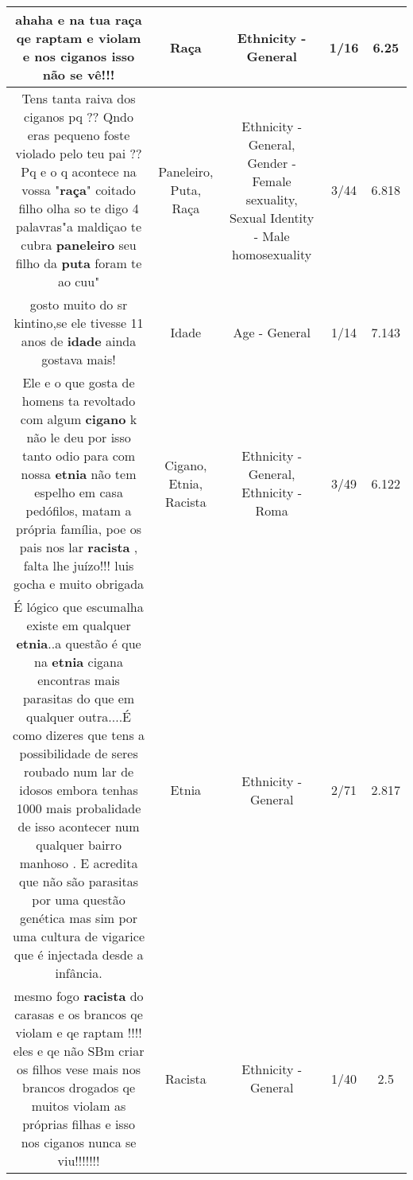 \documentclass[11pt]{article}
\newlength\mylength
\begin{document}
\begin{center}
\begin{longtable}{|C{.65\mylength}|C{.30\mylength}|C{.12\mylength}|C{.12\mylength}|C{.12\mylength}|}
  \small ahaha e na tua \textbf{raça} qe raptam e violam e nos ciganos isso não se vê!!!\normalsize   & Raça & Ethnicity - General & 1/16 & 6.25 \\  \hline
  \small Tens tanta raiva dos ciganos pq ?? Qndo eras pequeno foste violado pelo teu pai ?? Pq e o q acontece na vossa "\textbf{raça}" coitado filho olha so te digo 4 palavras"a maldiçao te cubra \textbf{paneleiro} seu filho da \textbf{puta} foram te ao cuu"\normalsize   & Paneleiro, Puta, Raça & Ethnicity - General, Gender - Female sexuality, Sexual Identity - Male homosexuality & 3/44 & 6.818 \\  \hline
  \small gosto muito do sr kintino,se ele tivesse 11 anos de \textbf{idade} ainda gostava mais!\normalsize   & Idade & Age - General & 1/14 & 7.143 \\  \hline
  \small Ele e o que gosta de homens ta revoltado com algum \textbf{cigano} k não le deu por isso tanto odio para com nossa \textbf{etnia} não tem espelho em casa pedófilos, matam a própria família, poe os pais nos lar \textbf{racista} , falta lhe juízo!!! luis gocha e muito obrigada\normalsize   & Cigano, Etnia, Racista & Ethnicity - General, Ethnicity - Roma & 3/49 & 6.122 \\  \hline
  \small É lógico que escumalha existe em qualquer \textbf{etnia}..a questão é que na \textbf{etnia} cigana encontras mais parasitas do que em qualquer outra....É como  dizeres que tens a possibilidade de seres roubado num lar de idosos embora tenhas 1000 mais probalidade de isso acontecer num qualquer bairro manhoso . E acredita que não são parasitas por uma questão genética mas sim por uma cultura de vigarice que é injectada desde a infância.\normalsize   & Etnia & Ethnicity - General & 2/71 & 2.817 \\  \hline
  \small mesmo fogo \textbf{racista} do carasas e os brancos qe violam e qe raptam !!!! eles e qe não SBm criar os filhos vese mais nos brancos drogados qe muitos violam as próprias filhas e isso nos ciganos nunca se viu!!!!!!!\normalsize   & Racista & Ethnicity - General & 1/40 & 2.5 \\  \hline

\end{longtable}
\end{center}
\end{document}
